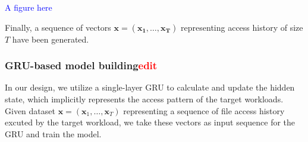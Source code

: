 \documentclass[conference]{IEEEtran}
\begin{document}
\textcolor{blue}{A figure here}

Finally, a sequence of vectors $\mathbf{x}=(\mathbf{x_1}, \dots, \mathbf{x_T})$ representing access history of size $T$ have been generated.

\subsubsection{GRU-based model building\textcolor{red}{edit}}
In our design, we utilize a single-layer GRU to calculate and update the hidden state, which implicitly represents the access pattern of the target workloads. 
Given dataset $\mathbf{x} = (\mathbf{x}_1,\dots,\mathbf{x}_T)$ representing a sequence of file access history excuted by the target workload, 
we take these vectors as input sequence for the GRU and train the model. 
\end{document}
